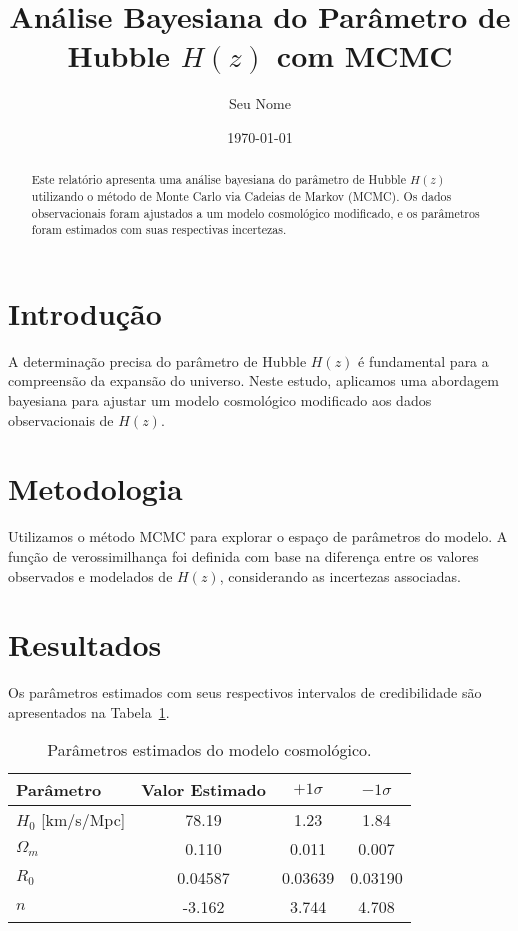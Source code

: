 \documentclass[12pt]{article}
\title{Análise Bayesiana do Parâmetro de Hubble $H(z)$ com MCMC}
\author{Seu Nome}
\affil{Instituição ou Afiliação}
\date{\today}
\begin{document}
\maketitle

\begin{abstract}
Este relatório apresenta uma análise bayesiana do parâmetro de Hubble $H(z)$ utilizando o método de Monte Carlo via Cadeias de Markov (MCMC). Os dados observacionais foram ajustados a um modelo cosmológico modificado, e os parâmetros foram estimados com suas respectivas incertezas.
\end{abstract}

\section{Introdução}

A determinação precisa do parâmetro de Hubble $H(z)$ é fundamental para a compreensão da expansão do universo. Neste estudo, aplicamos uma abordagem bayesiana para ajustar um modelo cosmológico modificado aos dados observacionais de $H(z)$.

\section{Metodologia}

Utilizamos o método MCMC para explorar o espaço de parâmetros do modelo. A função de verossimilhança foi definida com base na diferença entre os valores observados e modelados de $H(z)$, considerando as incertezas associadas.

\section{Resultados}

Os parâmetros estimados com seus respectivos intervalos de credibilidade são apresentados na Tabela~\ref{tab:params}.

\begin{table}[h!]
\centering
\caption{Parâmetros estimados do modelo cosmológico.}
\label{tab:params}
\begin{tabular}{lccc}
\toprule
Parâmetro & Valor Estimado & $+1\sigma$ & $-1\sigma$ \\
\midrule
$H_0$ [km/s/Mpc] & 78.19 & 1.23 & 1.84 \\
$\Omega_m$ & 0.110 & 0.011 & 0.007 \\
$R_0$ & 0.04587 & 0.03639 & 0.03190 \\
$n$ & -3.162 & 3.744 & 4.708 \\
\bottomrule
\end{tabular}
\end{table}
\end{document}

